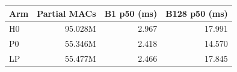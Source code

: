 \begin{tabular}{lrrr}
\toprule Arm & Partial MACs & B1 p50 (ms) & B128 p50 (ms)\\\midrule
H0&95.028M&2.967&17.991\\
P0&55.346M&2.418&14.570\\
LP&55.477M&2.466&17.845\\
\bottomrule\end{tabular}
